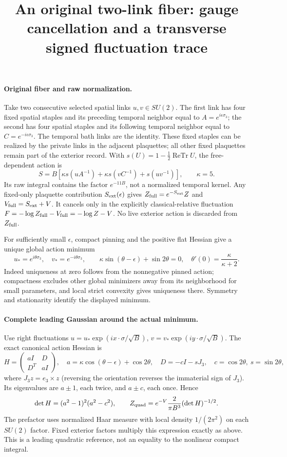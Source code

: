 \documentclass[11pt]{article}
\title{An original two-link fiber: gauge cancellation and a transverse signed fluctuation trace}\author{}\date{}
\begin{document}
\maketitle
\paragraph{Original fiber and raw normalization.}
Take two consecutive selected spatial links $u,v\in SU(2)$.
The first link has four fixed spatial staples and its preceding temporal
neighbor equal to $A=e^{i\epsilon\sigma_3}$; the second has four spatial
staples and its following temporal neighbor equal to
$C=e^{-i\epsilon\sigma_3}$. The temporal bath links are the identity.
These fixed staples can be realized by the private links in the adjacent
plaquettes; all other fixed plaquettes remain part of the exterior record.
With $s(U)=1-\frac12\operatorname{ReTr}U$, the free-dependent action is
\[
 S=B[\kappa s(uA^{-1})+\kappa s(vC^{-1})+s(uv^{-1})],\qquad \kappa=5.
\]
Its raw integral contains the factor $e^{-11B}$, not a normalized temporal
kernel. Any fixed-only plaquette contribution $S_{\rm ext}(\epsilon)$ gives
$Z_{\rm full}=e^{-S_{\rm ext}}Z$ and
$V_{\rm full}=S_{\rm ext}+V$. It cancels only in the explicitly
classical-relative fluctuation $F=-\log Z_{\rm full}-V_{\rm full}
=-\log Z-V$. No live exterior action is discarded from $Z_{\rm full}$.

For sufficiently small $\epsilon$, compact pinning and the positive flat
Hessian give a unique global action minimum
\[
 u_*=e^{i\theta\sigma_3},\quad v_*=e^{-i\theta\sigma_3},\qquad
 \kappa\sin(\theta-\epsilon)+\sin2\theta=0,\quad
 \theta'(0)=\frac{\kappa}{\kappa+2}.
\]
Indeed uniqueness at zero follows from the nonnegative pinned action;
compactness excludes other global minimizers away from its neighborhood
for small parameters, and local strict convexity gives uniqueness there.
Symmetry and stationarity identify the displayed minimum.

\paragraph{Complete leading Gaussian around the actual minimum.}
Use right fluctuations
$u=u_*\exp(i x\cdot\sigma/\sqrt B)$,
$v=v_*\exp(i y\cdot\sigma/\sqrt B)$. The exact canonical action Hessian is
\[
 H=\begin{pmatrix}aI&D\\D^T&aI\end{pmatrix},\quad
 a=\kappa\cos(\theta-\epsilon)+\cos2\theta,\quad
 D=-cI-sJ_3,\quad c=\cos2\theta,\ s=\sin2\theta,
\]
where $J_3z=e_3\times z$ (reversing the orientation reverses the immaterial
sign of $J_3$). Its eigenvalues are $a\pm1$, each twice, and $a\pm c$,
each once. Hence
\[
 \det H=(a^2-1)^2(a^2-c^2),\qquad
 Z_{\rm quad}=e^{-V}\frac{2}{\pi B^3}(\det H)^{-1/2}.
\]
The prefactor uses normalized Haar measure with local density
$1/(2\pi^2)$ on each $SU(2)$ factor. Fixed exterior factors multiply this
expression exactly as above. This is a leading quadratic reference,
not an equality to the nonlinear compact integral.
\end{document}

